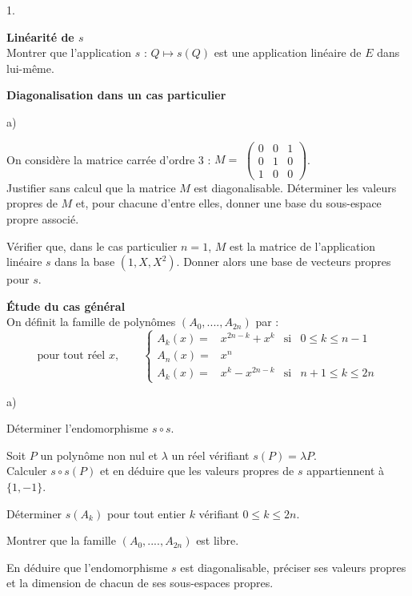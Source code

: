 \documentclass[11pt]{article}%
\begin{document}
\begin{noliste}{1.}
 \setlength{\itemsep}{4mm}
\item \textbf{Linéarité de $s$}\\
Montrer que l'application $s$ : $Q\mapsto s(Q)$ est une application
linéaire
de $E$ dans lui-même.

\item \textbf{Diagonalisation dans un cas particulier}

\begin{noliste}{a)}
 \setlength{\itemsep}{2mm}
\item On considère la matrice carrée d'ordre 3 : \quad $M = $ $\left( 
\begin{array}{ccc}
0 & 0 & 1 \\
0 & 1 & 0 \\
1 & 0 & 0
\end{array}
\right) $.\\
Justifier sans calcul que la matrice $M$ est diagonalisable. Déterminer
les
valeurs propres de $M$ et, pour chacune d'entre elles, donner une base
du
sous-espace propre associé.

\item Vérifier que, dans le cas particulier $n = 1$, $M$ est la matrice
de
l'application linéaire $s$ dans la base $(1,X,X^{2})$. Donner alors une
base
de vecteurs propres pour $s$.
\end{noliste}

\item \textbf{Étude du cas général}\\
On définit la famille de polynômes $(A_{0},....,A_{2n})$ par : 
\[
\text{pour tout réel }x,\qquad \left\{ 
\begin{matrix}
A_{k}(x) = & x^{2n-k} + x^{k} & \text{si} & 0\leq k\leq {n-1} \\
A_{n}(x) = & x^{n} & & \\
A_{k}(x) = & x^{k}-x^{2n-k} & \text{si} & {n + 1}\leq k\leq
{2n}\end{matrix}\right.
\]

\begin{noliste}{a)}
 \setlength{\itemsep}{2mm}
\item Déterminer l'endomorphisme $s\circ s$.

\item Soit $P$ un polynôme non nul et $\lambda $ un réel vérifiant
$s(P) = \lambda P$.\\
Calculer $s\circ s(P)$ et en déduire que les valeurs propres de $s$
appartiennent à $\{1,-1\}$.

\item Déterminer $s(A_{k})$ pour tout entier $k$ vérifiant $0\leq
k\leq {2n}$.

\item Montrer que la famille $(A_{0},....,A_{2n})$ est libre.

\item En déduire que l'endomorphisme $s$ est diagonalisable, préciser
ses
valeurs propres et la dimension de chacun de ses sous-espaces propres.
\end{noliste}
\end{noliste}
\end{document}
